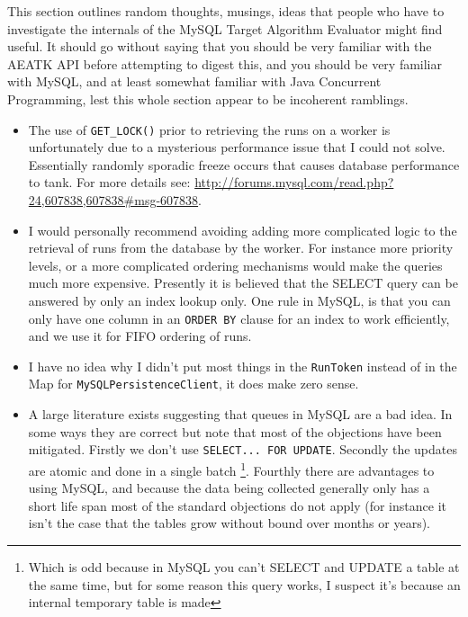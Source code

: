 \documentclass[11pt,letterpaper,oneside]{article}
\begin{document}
This section outlines random thoughts, musings, ideas that people who have to investigate the internals of the MySQL Target Algorithm Evaluator might find useful. It should go without saying that you should be very familiar with the AEATK API before attempting to digest this, and you should be very familiar with MySQL, and at least somewhat familiar with Java Concurrent Programming, lest this whole section appear to be incoherent ramblings.

\begin{itemize}

\item The use of \texttt{GET\_LOCK()} prior to retrieving the runs on a worker is unfortunately due to a mysterious performance issue that I could not solve. Essentially randomly sporadic freeze occurs that causes database performance to tank. For more details see: \url{http://forums.mysql.com/read.php?24,607838,607838\#msg-607838}. 

\item I would personally recommend avoiding adding more complicated logic to the retrieval of runs from the database by the worker. For instance more priority levels, or a more complicated ordering mechanisms would make the queries much more expensive. Presently it is believed that the SELECT query can be answered by only an index lookup only. One rule in MySQL, is that you can only have one column in an \texttt{ORDER BY} clause for an index to work efficiently, and we use it for FIFO ordering of runs.

\item I have no idea why I didn't put most things in the \texttt{RunToken} instead of in the Map for \texttt{MySQLPersistenceClient}, it does make zero sense.

\item A large literature exists suggesting that queues in MySQL are a bad idea. In some ways they are correct but note that most of the objections have been mitigated. Firstly we don't use \texttt{SELECT... FOR UPDATE}. Secondly the updates are atomic and done in a single batch \footnote{Which is odd because in MySQL you can't SELECT and UPDATE a table at the same time, but for some reason this query works, I suspect it's because an internal temporary table is made}. Fourthly there are advantages to using MySQL, and because the data being collected generally only has a short life span most of the standard objections do not apply (for instance it isn't the case that the tables grow without bound over months or years).


\end{itemize}
\end{document}
